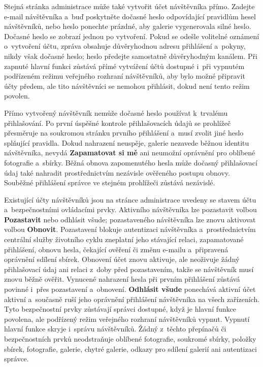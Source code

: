 \documentclass[11pt,a4paper]{article}
\newcommand{\ui}[1]{\textbf{#1}}
\begin{document}
Stejná stránka administrace může také vytvořit účet návštěvníka přímo. Zadejte
e-mail návštěvníka a~buď poskytněte dočasné heslo odpovídající pravidlům hesel
návštěvníků, nebo heslo ponechte prázdné, aby galerie vygenerovala silné heslo.
Dočasné heslo se zobrazí jednou po vytvoření. Pokud se odešle volitelné oznámení
o~vytvoření účtu, zpráva obsahuje důvěryhodnou adresu přihlášení a~pokyny, nikdy
však dočasné heslo; heslo předejte samostatně důvěryhodným kanálem. Při zapnuté
hlavní funkci zůstává přímé vytváření účtů dostupné i~při vypnutém podřízeném
režimu veřejného rozhraní návštěvníků, aby bylo možné připravit účty předem, ale
tito návštěvníci se nemohou přihlásit, dokud není tento režim povolen.

Přímo vytvořený návštěvník nemůže dočasné heslo používat k~trvalému
přihlašování. Po první úspěšné kontrole přihlašovacích údajů se prohlížeč
přesměruje na soukromou stránku prvního přihlášení a~musí zvolit jiné heslo
splňující pravidla. Dokud nahrazení neuspěje, galerie nezavede běžnou identitu
návštěvníka, nevydá \ui{Zapamatovat si mě} ani neumožní oprávnění pro oblíbené
fotografie a~sbírky. Běžná obnova zapomenutého hesla může dočasný přihlašovací
údaj také nahradit prostřednictvím nezávisle ověřeného postupu obnovy. Souběžné
přihlášení správce ve stejném prohlížeči zůstává nezávislé.

Existující účty návštěvníků jsou na stránce administrace uvedeny se stavem účtu
a~bezpečnostními ovládacími prvky. Aktivního návštěvníka lze pozastavit volbou
\ui{Pozastavit} nebo odhlásit všude; pozastaveného návštěvníka lze znovu
aktivovat volbou \ui{Obnovit}. Pozastavení blokuje autentizaci návštěvníka
a~prostřednictvím centrální služby životního cyklu zneplatní jeho stávající
relaci, zapamatované přihlášení, obnovu hesla, čekající ověření či změnu e-mailu
a~připravená oprávnění sdílení sbírek. Obnovení účet znovu aktivuje, ale
neoživuje žádný přihlašovací údaj ani relaci z~doby před pozastavením, takže se
návštěvník musí znovu běžně ověřit. Vynucené nahrazení hesla při prvním
přihlášení zůstává povinné i~přes pozastavení a~obnovení. \ui{Odhlásit všude}
ponechává aktivní účet aktivní a~současně ruší jeho oprávnění přihlášení
návštěvníka na všech zařízeních. Tyto bezpečnostní prvky zůstávají správci
dostupné, když je hlavní funkce povolena, ale podřízený režim veřejného rozhraní
návštěvníků vypnut. Vypnutí hlavní funkce skryje i~správu návštěvníků. Žádný
z~těchto přepínačů či bezpečnostních prvků neodstraňuje oblíbené fotografie,
soukromé sbírky, položky sbírek, fotografie, galerie, chytré galerie, odkazy pro
sdílení galerií ani autentizaci správce.
\end{document}
